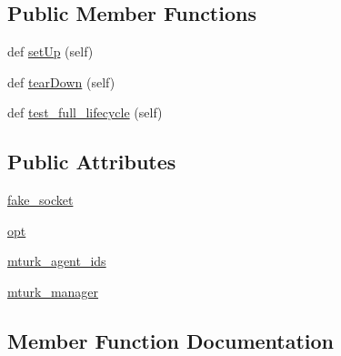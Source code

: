 \subsection*{Public Member Functions}
\begin{DoxyCompactItemize}
\item 
def \hyperlink{classparlai_1_1mturk_1_1core_1_1dev_1_1test_1_1test__mturk__manager_1_1TestMTurkManagerLifecycleFunctions_aba5d51ff898867834346b0e91104d665}{set\+Up} (self)
\item 
def \hyperlink{classparlai_1_1mturk_1_1core_1_1dev_1_1test_1_1test__mturk__manager_1_1TestMTurkManagerLifecycleFunctions_ace4806b37df5bc022c7b33061d580746}{tear\+Down} (self)
\item 
def \hyperlink{classparlai_1_1mturk_1_1core_1_1dev_1_1test_1_1test__mturk__manager_1_1TestMTurkManagerLifecycleFunctions_a33dbbefd45dab90f29727329657e7767}{test\+\_\+full\+\_\+lifecycle} (self)
\end{DoxyCompactItemize}
\subsection*{Public Attributes}
\begin{DoxyCompactItemize}
\item 
\hyperlink{classparlai_1_1mturk_1_1core_1_1dev_1_1test_1_1test__mturk__manager_1_1TestMTurkManagerLifecycleFunctions_a4ab9d14a9af11d15eec48b95d9dea751}{fake\+\_\+socket}
\item 
\hyperlink{classparlai_1_1mturk_1_1core_1_1dev_1_1test_1_1test__mturk__manager_1_1TestMTurkManagerLifecycleFunctions_af1ac135ec91429e6729faab342eb2026}{opt}
\item 
\hyperlink{classparlai_1_1mturk_1_1core_1_1dev_1_1test_1_1test__mturk__manager_1_1TestMTurkManagerLifecycleFunctions_a42ea25be9d334c2cc753a39ce9131834}{mturk\+\_\+agent\+\_\+ids}
\item 
\hyperlink{classparlai_1_1mturk_1_1core_1_1dev_1_1test_1_1test__mturk__manager_1_1TestMTurkManagerLifecycleFunctions_a3152c56d23692852f6bb1901a8a5f2c4}{mturk\+\_\+manager}
\end{DoxyCompactItemize}


\subsection{Member Function Documentation}
\mbox{\label{classparlai_1_1mturk_1_1core_1_1dev_1_1test_1_1test__mturk__manager_1_1TestMTurkManagerLifecycleFunctions_aba5d51ff898867834346b0e91104d665}} 
